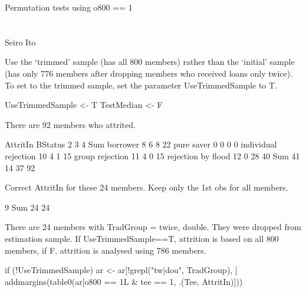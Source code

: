 \hfil Permutation tests using \textsf{o800} == 1\\

\hfil\MonthDY\\
\hfil{\footnotesize\currenttime}\\

\hfil Seiro Ito

\setcounter{tocdepth}{3}
\tableofcontents

\setlength{\parindent}{1em}
\vspace{2ex}


Use the `trimmed' sample (has all 800 members) rather than the `initial' sample (has only 776 members after dropping members who received loans only twice). To set to the trimmed sample, set the parameter \textsf{UseTrimmedSample} to T.
\begin{Schunk}
\begin{Sinput}
UseTrimmedSample <- T
TestMedian <- F
\end{Sinput}
\end{Schunk}

There are 92 members who attrited.
\begin{Schunk}
\begin{Soutput}
                      AttritIn
BStatus                 2  3  4 Sum
  borrower              8  6  8  22
  pure saver            0  0  0   0
  individual rejection 10  4  1  15
  group rejection      11  4  0  15
  rejection by flood   12  0 28  40
  Sum                  41 14 37  92
\end{Soutput}
\end{Schunk}

Correct \textsf{AttritIn} for these 24 members. Keep only the 1st obs for all members.
\begin{Schunk}
\begin{Soutput}

  9 Sum 
 24  24 
\end{Soutput}
\end{Schunk}
There are 24 members with TradGroup = twice, double. They were dropped from estimation sample. If \textsf{UseTrimmedSample==T}, attrition is based on all 800 members, if \textsf{F}, attrition is analysed using 786 members.
\begin{Schunk}
\begin{Sinput}
if (!UseTrimmedSample) ar <- ar[!grepl("tw|dou", TradGroup), ]
addmargins(table0(ar[o800 == 1L & tee == 1, .(Tee, AttritIn)]))
\end{Sinput}
\end{Schunk}


